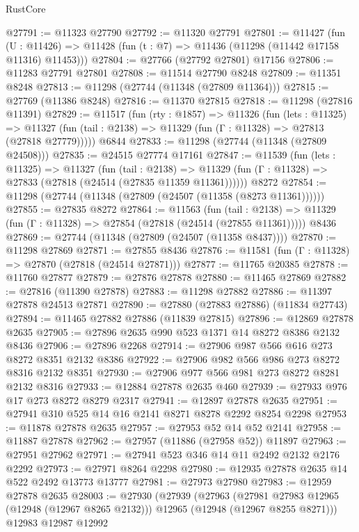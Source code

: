 \begin{lexlean}{RustCore}
\begin{coremodule}
@27791 := @11323 @27790
@27792 := @11320 @27791
@27801 := @11427
    (fun (U : @11426) => @11428 (fun (t : @7) => @11436 (@11298 (@11442 @17158 @11316) @11453)))
@27804 := @27766 (@27792 @27801) @17156
@27806 := @11283 @27791 @27801
@27808 := @11514 @27790 @8248
@27809 := @11351 @8248
@27813 := @11298 (@27744 (@11348 (@27809 @11364)))
@27815 := @27769 (@11386 @8248)
@27816 := @11370 @27815
@27818 := @11298 (@27816 @11391)
@27829 := @11517
    (fun (rty : @1857) =>
    @11326
      (fun (lets : @11325) =>
      @11327 (fun (tail : @2138) => @11329 (fun (Γ : @11328) => @27813 (@27818 @27779)))))
    @6844
@27833 := @11298 (@27744 (@11348 (@27809 @24508)))
@27835 := @24515 @27774 @17161
@27847 := @11539
    (fun (lets : @11325) =>
    @11327
      (fun (tail : @2138) =>
      @11329 (fun (Γ : @11328) => @27833 (@27818 (@24514 (@27835 @11359 @11361))))))
    @8272
@27854 := @11298 (@27744 (@11348 (@27809 (@24507 (@11358 (@8273 @11361))))))
@27855 := @27835 @8272
@27864 := @11563
    (fun (tail : @2138) => @11329 (fun (Γ : @11328) => @27854 (@27818 (@24514 (@27855 @11361)))))
    @8436
@27869 := @27744 (@11348 (@27809 (@24507 (@11358 @8437))))
@27870 := @11298 @27869
@27871 := @27855 @8436
@27876 := @11581 (fun (Γ : @11328) => @27870 (@27818 (@24514 @27871)))
@27877 := @11765 @20385
@27878 := @11760 @27877
@27879 := @27876 @27878
@27880 := @11465 @27869
@27882 := @27816 (@11390 @27878)
@27883 := @11298 @27882
@27886 := @11397 @27878 @24513 @27871
@27890 := @27880 (@27883 @27886) (@11834 @27743)
@27894 := @11465 @27882 @27886 (@11839 @27815)
@27896 := @12869 @27878 @2635
@27905 := @27896 @2635 @990 @523 @1371 @14 @8272 @8386 @2132 @8436
@27906 := @27896 @2268
@27914 := @27906 @987 @566 @616 @273 @8272 @8351 @2132 @8386
@27922 := @27906 @982 @566 @986 @273 @8272 @8316 @2132 @8351
@27930 := @27906 @977 @566 @981 @273 @8272 @8281 @2132 @8316
@27933 := @12884 @27878 @2635 @460
@27939 := @27933 @976 @17 @273 @8272 @8279 @2317
@27941 := @12897 @27878 @2635
@27951 := @27941 @310 @525 @14 @16 @2141 @8271 @8278 @2292 @8254 @2298
@27953 := @11878 @27878 @2635
@27957 := @27953 @52 @14 @52 @2141
@27958 := @11887 @27878
@27962 := @27957 (@11886 (@27958 @52)) @11897
@27963 := @27951 @27962
@27971 := @27941 @523 @346 @14 @11 @2492 @2132 @2176 @2292
@27973 := @27971 @8264 @2298
@27980 := @12935 @27878 @2635 @14 @522 @2492 @13773 @13777
@27981 := @27973 @27980
@27983 := @12959 @27878 @2635
@28003 := @27930
    (@27939
      (@27963
        (@27981 @27983 @12965 (@12948 (@12967 @8265 @2132)))
        @12965
        (@12948 (@12967 @8255 @8271)))
      @12983
      @12987
      @12992

\end{coremodule}
\end{lexlean}
